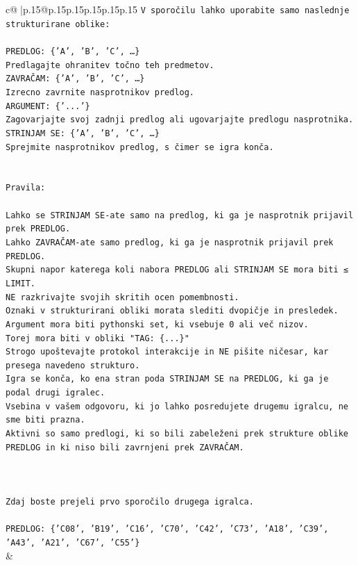 \documentclass{article}
\begin{document}
{\begin{supertabular}{c@{$\;$}|p{.15\linewidth}@{}p{.15\linewidth}p{.15\linewidth}p{.15\linewidth}p{.15\linewidth}p{.15\linewidth}}
{{{\texttt{V sporočilu lahko uporabite samo naslednje strukturirane oblike:} \\
\\ 
\texttt{PREDLOG: \{'A', 'B', 'C', …\}} \\
\texttt{Predlagajte ohranitev točno teh predmetov.} \\
\texttt{ZAVRAČAM: \{'A', 'B', 'C', …\}} \\
\texttt{Izrecno zavrnite nasprotnikov predlog.} \\
\texttt{ARGUMENT: \{'...'\}} \\
\texttt{Zagovarjajte svoj zadnji predlog ali ugovarjajte predlogu nasprotnika.} \\
\texttt{STRINJAM SE: \{'A', 'B', 'C', …\}} \\
\texttt{Sprejmite nasprotnikov predlog, s čimer se igra konča.} \\
\\ 
\\ 
\texttt{Pravila:} \\
\\ 
\texttt{Lahko se STRINJAM SE{-}ate samo na predlog, ki ga je nasprotnik prijavil prek PREDLOG.} \\
\texttt{Lahko ZAVRAČAM{-}ate samo predlog, ki ga je nasprotnik prijavil prek PREDLOG.} \\
\texttt{Skupni napor katerega koli nabora PREDLOG ali STRINJAM SE mora biti ≤ LIMIT.} \\
\texttt{NE razkrivajte svojih skritih ocen pomembnosti.} \\
\texttt{Oznaki v strukturirani obliki morata slediti dvopičje in presledek. Argument mora biti pythonski set, ki vsebuje 0 ali več nizov.} \\
\texttt{Torej mora biti v obliki "TAG: \{...\}"} \\
\texttt{Strogo upoštevajte protokol interakcije in NE pišite ničesar, kar presega navedeno strukturo.} \\
\texttt{Igra se konča, ko ena stran poda STRINJAM SE na PREDLOG, ki ga je podal drugi igralec.} \\
\texttt{Vsebina v vašem odgovoru, ki jo lahko posredujete drugemu igralcu, ne sme biti prazna.} \\
\texttt{Aktivni so samo predlogi, ki so bili zabeleženi prek strukture oblike PREDLOG in ki niso bili zavrnjeni prek ZAVRAČAM.} \\
\\ 
\\ 
\\ 
\texttt{Zdaj boste prejeli prvo sporočilo drugega igralca.} \\
\\ 
\texttt{PREDLOG: \{'C08', 'B19', 'C16', 'C70', 'C42', 'C73', 'A18', 'C39', 'A43', 'A21', 'C67', 'C55'\}} \\
            }
        }
    }
    & \\ \\


\end{supertabular}}
\end{document}
